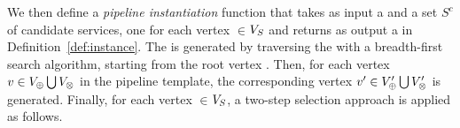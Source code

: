    We then define a \emph{pipeline instantiation} function that takes as input a \pipelineTemplate \tChartFunction and a set $S^c$ of candidate services, one for each vertex $\in$$V_S$ and returns as output a \pipelineInstance \iChartFunction in Definition~\ref{def:instance}.
    The \pipelineInstance  is generated by traversing the \pipelineTemplate with a breadth-first search algorithm, starting from the root vertex .
    Then, for each vertex $v\in V_{\oplus}\bigcup V_{\otimes}$ in the pipeline template, the corresponding vertex $v'\in V'_{\oplus}\bigcup V'_{\otimes}$ is generated.
    Finally, for each vertex $\in$$V_S$, a two-step selection approach is applied as follows.

